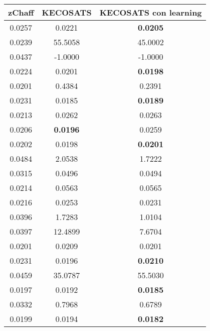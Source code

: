 \begin{longtable}{c|c c}
\hspace{1cm}\textbf{zChaff}\hspace{1cm} & \textbf{KECOSATS} & \textbf{KECOSATS con learning}\\\hline

0.0257 & 0.0221 & \textbf{0.0205} \\

0.0239 & 55.5058 & 45.0002 \\

0.0437 & -1.0000 & -1.0000 \\

0.0224 & 0.0201 & \textbf{0.0198}\\

0.0201 & 0.4384 & 0.2391 \\

0.0231 & 0.0185 & \textbf{0.0189} \\

0.0213 & 0.0262 & 0.0263 \\

0.0206 & \textbf{0.0196} & 0.0259 \\

0.0202 & 0.0198 & \textbf{0.0201}\\

0.0484 & 2.0538 & 1.7222 \\
\hline
0.0315 & 0.0496 & 0.0494 \\

0.0214 & 0.0563 & 0.0565 \\

0.0216 & 0.0253 & 0.0231  \\

0.0396 & 1.7283 & 1.0104 \\

0.0397 & 12.4899 & 7.6704 \\

0.0201 & 0.0209  & 0.0201 \\

0.0231 & 0.0196 & \textbf{0.0210} \\

0.0459 & 35.0787 & 55.5030 \\

0.0197 & 0.0192 & \textbf{0.0185} \\

0.0332 & 0.7968 & 0.6789 \\
\hline
0.0199 & 0.0194 & \textbf{0.0182} \\


\end{longtable}
